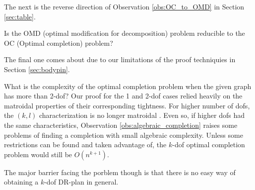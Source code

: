 The next is the reverse direction of Observation \ref{obs:OC_to_OMD} in Section \ref{sec:table}.

\begin{openproblem}
    Is the OMD (optimal modification for decomposition) problem  
    reducible to the OC (Optimal completion) problem?
\end{openproblem}

The final one comes about due to our limitations of the proof techniquies in Section \ref{sec:bodypin}.

\begin{openproblem}
    What is the complexity of the optimal completion problem when the given graph has more than 2-dof? Our proof for the 1 and 2-dof cases relied heavily on the matroidal properties of their corresponding tightness. For higher number of dofs, the $(k,l)$ characterization is no longer matroidal \cite{Lee:2007:PGA}. Even so, if higher dofs had the same characteristics, Observation \ref{obs:algebraic_completion} raises some problems of finding a completion with small algebraic complexity. Unless some restrictions can be found and taken advantage of, the $k$-dof optimal completion problem would still be $O(n^{k+1})$. 

    The major barrier facing the porblem though is that there is no easy way of obtaining a $k$-dof DR-plan in general. 
\end{openproblem}


